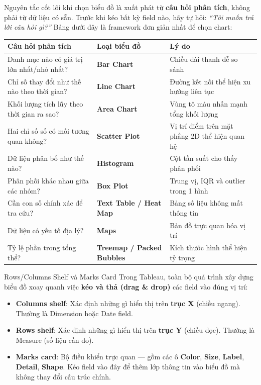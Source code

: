 \documentclass[12pt]{article}
\begin{document}
\noindent Nguyên tắc cốt lõi khi chọn biểu đồ là xuất phát từ \textbf{câu hỏi phân tích}, không phải từ dữ liệu có sẵn. Trước khi kéo bất kỳ field nào, hãy tự hỏi: \textit{``Tôi muốn trả lời câu hỏi gì?''} Bảng dưới đây là framework đơn giản nhất để chọn chart:

\begin{center}
\renewcommand{\arraystretch}{1.4}
\begin{tabularx}{\linewidth}{>{\raggedright\arraybackslash}X >{\raggedright\arraybackslash}p{3.5cm} >{\raggedright\arraybackslash}X}
\toprule
\textbf{Câu hỏi phân tích} & \textbf{Loại biểu đồ} & \textbf{Lý do} \\
\midrule
Danh mục nào có giá trị lớn nhất/nhỏ nhất? & \textbf{Bar Chart} & Chiều dài thanh dễ so sánh \\
Chỉ số thay đổi như thế nào theo thời gian? & \textbf{Line Chart} & Đường kết nối thể hiện xu hướng liên tục \\
Khối lượng tích lũy theo thời gian ra sao? & \textbf{Area Chart} & Vùng tô màu nhấn mạnh tổng khối lượng \\
Hai chỉ số số có mối tương quan không? & \textbf{Scatter Plot} & Vị trí điểm trên mặt phẳng 2D thể hiện quan hệ \\
Dữ liệu phân bố như thế nào? & \textbf{Histogram} & Cột tần suất cho thấy phân phối \\
Phân phối khác nhau giữa các nhóm? & \textbf{Box Plot} & Trung vị, IQR và outlier trong 1 hình \\
Cần con số chính xác để tra cứu? & \textbf{Text Table / Heat Map} & Bảng số liệu không mất thông tin \\
Dữ liệu có yếu tố địa lý? & \textbf{Maps} & Bản đồ trực quan hóa vị trí \\
Tỷ lệ phần trong tổng thể? & \textbf{Treemap / Packed Bubbles} & Kích thước hình thể hiện tỷ trọng \\
\bottomrule
\end{tabularx}
\end{center}

\begin{conceptbox}{Rows/Columns Shelf và Marks Card}
Trong Tableau, toàn bộ quá trình xây dựng biểu đồ xoay quanh việc \textbf{kéo và thả (drag \& drop)} các field vào đúng vị trí:
\begin{itemize}[nosep]
    \item \textbf{Columns shelf}: Xác định những gì hiển thị trên \textbf{trục X} (chiều ngang). Thường là Dimension hoặc Date field.
    \item \textbf{Rows shelf}: Xác định những gì hiển thị trên \textbf{trục Y} (chiều dọc). Thường là Measure (số liệu cần đo).
    \item \textbf{Marks card}: Bộ điều khiển trực quan --- gồm các ô \textbf{Color}, \textbf{Size}, \textbf{Label}, \textbf{Detail}, \textbf{Shape}. Kéo field vào đây để thêm lớp thông tin vào biểu đồ mà không thay đổi cấu trúc chính.
\end{itemize}
\end{conceptbox}
\end{document}
